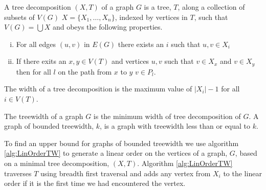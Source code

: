 %    
%    
%    
%    
%    
%
%    

\begin{definition}
    A tree decomposition $(X,T)$ of a graph $G$ is a tree, $T$, along a collection of subsets of $V(G)$ $X=\{X_1,\dots,X_n\}$, indexed by vertices in $T$, such that $V(G)=\bigcup X$ and obeys the following properties.
    \begin{enumerate}[(i)]
        \item For all edges $(u,v)$ in $E(G)$ there exists an $i$ such that $u,v\in X_i$
        \item  If there exits an $x,y\in V(T)$ and vertices $u,v$ such that $v\in X_x$ and $v\in X_y$ then for all $l$ on the path from $x$ to $y$ $v\in P_l$.
    \end{enumerate} 
    The width of a tree decomposition is the maximum value of $|X_i| -1$ for all $i\in V(T)$.
\end{definition}

\begin{definition}[Treewidth]
    The treewidth of a graph $G$ is the minimum width of tree decomposition of $G$.    
    A graph of bounded treewidth, $k$, is a graph with treewidth less than or equal to $k$. 
\end{definition}

To find an upper bound for graphs of bounded treewidth we use algorithm \ref{alg:LinOrderTW} to generate a linear order on the vertices of a graph, $G$, based on a minimal tree decomposition, $(X,T)$. Algorithm \ref{alg:LinOrderTW} traverses $T$ using breadth first traversal and adds any vertex from $X_i$ to the linear order if it is the first time we  had encountered the vertex.

